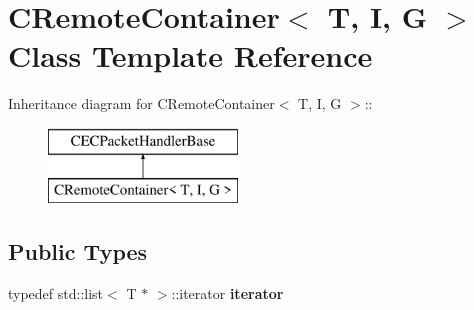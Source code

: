 \section{CRemoteContainer$<$ T, I, G $>$ Class Template Reference}
\label{classCRemoteContainer}
Inheritance diagram for CRemoteContainer$<$ T, I, G $>$::\begin{figure}[H]
\begin{center}
\leavevmode
\includegraphics[height=2cm]{classCRemoteContainer}
\end{center}
\end{figure}
\subsection*{Public Types}
\begin{DoxyCompactItemize}
\item 
typedef std::list$<$ T $\ast$ $>$::iterator {\bfseries iterator}\label{classCRemoteContainer_af264321d497eb999ad39074a40f95dc5}

\end{DoxyCompactItemize}
